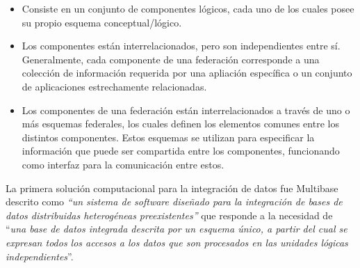 \begin{itemize}
    \item Consiste en un conjunto de componentes lógicos, cada uno de los cuales posee su propio esquema conceptual/lógico.
    \item Los componentes están interrelacionados, pero son independientes entre sí. Generalmente, cada componente de una federación
    corresponde a una colección de información requerida por una apliación específica o un conjunto de aplicaciones
    estrechamente relacionadas.
    \item Los componentes de una federación están interrelacionados a través de uno o más esquemas federales, los cuales definen 
    los elementos comunes entre los distintos componentes. Estos esquemas se utilizan para especificar la información  que puede ser compartida
    entre los componentes, funcionando como interfaz para la comunicación entre estos.
\end{itemize}

La primera solución computacional para la integración de datos fue Multibase \cite{smith1981multibase} descrito como \textit{``un sistema de software
diseñado para la integración de bases de datos distribuidas heterogéneas preexistentes''} que responde a la necesidad
de ``\textit{una base de datos integrada descrita por un esquema único, a partir del cual se expresan todos los accesos a los datos que son
procesados en las unidades lógicas independientes}''.

